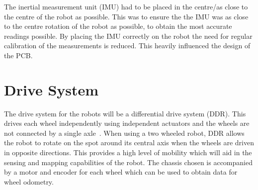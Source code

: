The inertial measurement unit (IMU) had to be placed in the centre/as close to the centre of the robot as possible. This was to ensure the the IMU was as close to the centre rotation of the robot as possible, to obtain the most accurate readings possible. By placing the IMU correctly on the robot the need for regular calibration of the measurements is reduced. This heavily influenced the design of the PCB. 


\section{Drive System}\label{mech/drive}

The drive system for the robots will be a differential drive system (DDR).
This drives each wheel independently using independent actuators and the
wheels are not connected by a single axle~\cite[p.~146]{braunl_embedded_2013}.
When using a two wheeled robot, DDR allows the
robot to rotate on the spot around its central axis when the wheels are
driven in opposite directions. This provides a high level of mobility which
will aid in the sensing and mapping capabilities of the robot. The chassis chosen is accompanied by a motor and encoder for each wheel which can be used to obtain data for wheel odometry. 
